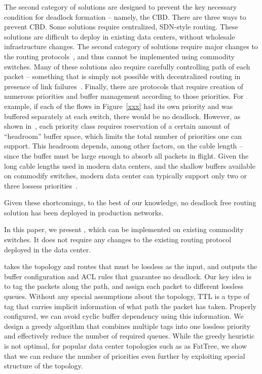 The second category of solutions are designed to prevent the key necessary
condition for deadlock formation -- namely, the CBD. There are three ways to
prevent CBD.  Some solutions require centralized, SDN-style routing.  These
solutions are difficult to deploy in existing data centers, without wholesale
infrastructure changes.  The second category of solutions require major changes
to the routing protocols~\cite{xxx}, and thus cannot be implemented using
commodity switches. Many of these solutions also require carefully controlling
path of each packet -- something that is simply not possible with decentralized
routing in presence of link failures~\cite{mingpaper}.  Finally, there are
protocols that require creation of numerous priorities and buffer management
according to those priorities. For example, if each of the flows in
Figure~\ref{xxx} had its own priority and was buffered separately at each
switch, there would be no deadlock. However, as shown in~\cite{cxpaper}, each
priority class requires reservation of a certain amount of ``headroom'' buffer
space, which limits the total number of priorities one can support. This
headroom depends, among other factors, on the cable length -- since the buffer
must be large enough to absorb all packets in flight.  Given the long cable
lengths used in modern data centers, and the shallow buffers available on
commodify switches, modern data center can typically support only two or three
lossess priorities~\cite{cx}.

Given these shortcomings, to the best of our knowledge, no deadlock free routing
solution has been deployed in production networks.

In this paper, we present \syname{}, which can be implemented on existing
commodity switches. It does not require any changes to the existing routing
protocol deployed in the data center. 

\sysname{} takes the topology and routes that must be lossless as the input, and
outputs the buffer configuration and ACL rules that guarantee no deadlock. Our
key idea is to tag the packets along the path, and assign each packet to
different lossless queues. Without any special assumptions about the topology,
TTL is a type of tag that carries implicit information of what path the packet
has taken.  Properly configured, we can avoid cyclic buffer dependency using
this information.  We design a greedy algorithm that combines multiple tags into
one lossless priority and effectively reduce the number of required queues.
While the greedy heuristic is not optimal, for popular data center topologies
such as as FatTree, we show that we can reduce the number of priorities even
further by exploiting special structure of the topology.

